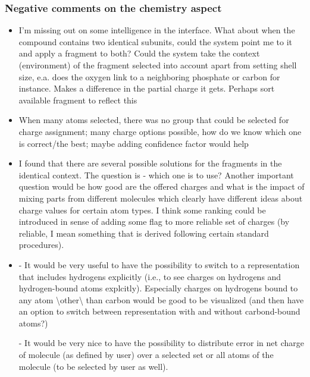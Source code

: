\subsubsection{Negative comments on the chemistry aspect}
\begin{itemize}
\item I'm missing out on some intelligence in the interface. What about when the compound contains two identical subunits, could the system point me to it and apply a fragment to both? Could the system take the context (environment) of the fragment selected into account apart from setting shell size, e.a. does the oxygen link to a neighboring phosphate or carbon for instance. Makes a difference in the partial charge it gets. Perhaps sort available fragment to reflect this

\item When many atoms selected, there was no group that could be selected for charge assignment; many charge options possible, how do we know which one is correct/the best; maybe adding confidence factor would help

\item I found that there are several possible solutions for the fragments in the identical context. The question is - which one is to use? Another important question would be how good are the offered charges and what is the impact of mixing parts from different molecules which clearly have different ideas about charge values for certain atom types. I think some ranking could be introduced in sense of adding some flag to more reliable set of charges (by reliable, I mean something that is derived following certain standard procedures).

\item - It would be very useful to have the possibility to switch to a representation that includes hydrogens explicitly (i.e., to see charges on hydrogens and hydrogen-bound atoms explcitly). Especially charges on hydrogens bound to any atom {\textbackslash}other{\textbackslash} than carbon would be good to be visualized (and then have an option to switch between representation with and without carbond-bound atoms?)

- It would be very nice to have the possibility to distribute error in net charge of molecule (as defined by user) over a selected set or all atoms of the molecule (to be selected by user as well).

\end{itemize}


